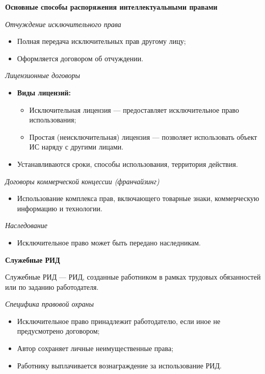 \textbf{Основные способы распоряжения интеллектуальными правами}

\textit{Отчуждение исключительного права}
\begin{itemize}
    \item Полная передача исключительных прав другому лицу;
    \item Оформляется договором об отчуждении.
\end{itemize}

\textit{Лицензионные договоры}
\begin{itemize}
    \item \textbf{Виды лицензий:}
    \begin{itemize}
        \item Исключительная лицензия --- предоставляет исключительное право использования;
        \item Простая (неисключительная) лицензия --- позволяет использовать объект ИС наряду с другими лицами.
    \end{itemize}
    \item Устанавливаются сроки, способы использования, территория действия.
\end{itemize}

\textit{Договоры коммерческой концессии (франчайзинг)}
\begin{itemize}
    \item Использование комплекса прав, включающего товарные знаки, коммерческую информацию и технологии.
\end{itemize}

\textit{Наследование}
\begin{itemize}
    \item Исключительное право может быть передано наследникам.
\end{itemize}

\textbf{Служебные РИД}

Служебные РИД --- РИД, созданные работником в рамках трудовых обязанностей или по заданию работодателя.

\textit{Специфика правовой охраны}

\begin{itemize}
    \item Исключительное право принадлежит работодателю, если иное не предусмотрено договором;
    \item Автор сохраняет личные неимущественные права;
    \item Работнику выплачивается вознаграждение за использование РИД.
\end{itemize}

